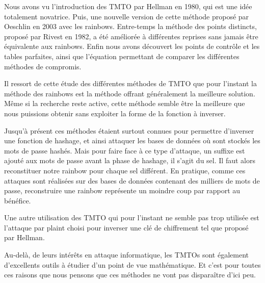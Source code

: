 
	Nous avons vu l'introduction des \gls{TMTO} par Hellman en 1980, qui est une idée totalement novatrice. Puis, une nouvelle version de cette méthode proposé par Oeschlin en 2003 avec les \glspl{rainbow}. Entre-temps la méthode des points distincts, proposé par Rivest en 1982, a été améliorée à différentes reprises sans jamais être équivalente aux \glspl{rainbow}. Enfin nous avons découvert les points de contrôle et les tables parfaites, ainsi que l'équation permettant de comparer les différentes méthodes de compromis.

	\bigskip

	Il ressort de cette étude des différentes méthodes de \gls{TMTO} que pour l'instant la méthode des \glspl{rainbow} est la méthode offrant généralement la meilleure solution. Même si la recherche reste active, cette méthode semble être la meilleure que nous puissions obtenir sans exploiter la forme de la fonction à inverser.

	\bigskip

	Jusqu'à présent ces méthodes étaient surtout connues pour permettre d'inverser une fonction de hashage, et ainsi attaquer les bases de données où sont stockés les mots de passe hashés. Mais pour faire face à ce type d'attaque, un suffixe est ajouté aux mots de passe avant la phase de hashage, il s'agit du sel. Il faut alors reconstituer notre \gls{rainbow} pour chaque sel différent. En pratique, comme ces attaques sont réalisées sur des bases de données contenant des milliers de mots de passe, reconstruire une \gls{rainbow} représente un moindre coup par rapport au bénéfice.

	\bigskip

	Une autre utilisation des \gls{TMTO} qui pour l'instant ne semble pas trop utilisée est l'attaque par \gls{plaint} choisi pour inverser une clé de chiffrement tel que proposé par Hellman.

	\bigskip

	Au-delà, de leurs intérêts en attaque informatique, les \glspl{TMTO} sont également d'excellents outils à étudier d'un point de vue mathématique. Et c'est pour toutes ces raisons que nous pensons que ces méthodes ne vont pas disparaître d'ici peu. 

\endinput{}

